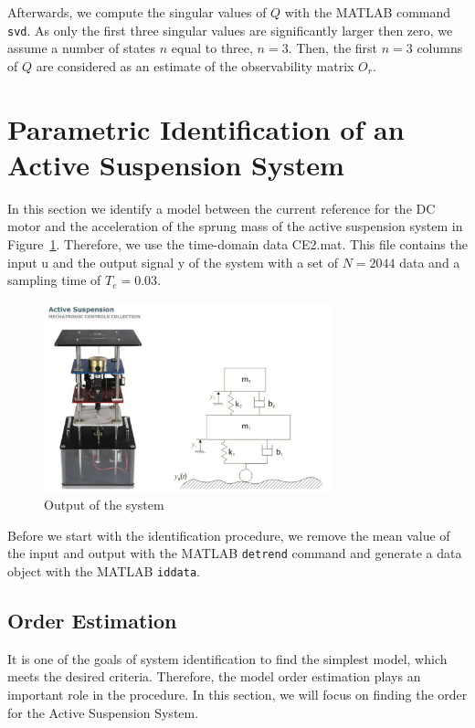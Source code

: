 \documentclass{scrartcl}
\begin{document}
Afterwards, we compute the singular values of $Q$ with the MATLAB command \texttt{svd}. As only the first three singular values are significantly larger then zero, we assume a number of states $n$ equal to three, $n=3$. Then, the first $n=3$ columns of $Q$ are considered as an estimate of the observability matrix $O_r$.


\newpage
\section{Parametric Identification of an Active Suspension System}

In this section we identify a model between the current reference for the DC motor and the acceleration of the sprung mass of the active suspension system in Figure~\ref{fig:active_suspension}. 
Therefore, we use the time-domain data CE2.mat. This file contains the input u and the output signal y of the system with a set of $N = 2044$ data and a sampling time of $T_e = 0.03$. \\

\begin{figure}[h]
	\centering
	\includegraphics[height=5.5cm]{figures/active_suspension.png}
	\caption{Output of the system}\label{fig:active_suspension}
\end{figure}


Before we start with the identification procedure, we remove the mean value of the input and output with the MATLAB \texttt{detrend} command and generate a data object with the MATLAB \texttt{iddata}.

\subsection{Order Estimation}

It is one of the goals of system identification to find the simplest model, which meets the desired criteria. Therefore, the model order estimation plays an important role in the procedure. In this section, we will focus on finding the order for the Active Suspension System. 
\end{document}
